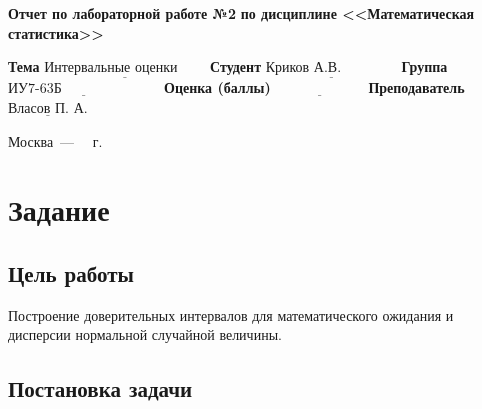 \documentclass[12pt]{report}
\begin{document}
\begin{titlepage}
		\begin{center}
			\noindent\begin{minipage}{1.1\textwidth}\centering
				\Large\textbf{  Отчет по лабораторной работе №2}\newline
				\textbf{по дисциплине <<Математическая статистика>>}\newline\newline\newline\newline
			\end{minipage}
		\end{center}
		
		\noindent\textbf{Тема} $\underline{\text{Интервальные оценки~~~~~~}}$\newline\newline
		\noindent\textbf{Студент} $\underline{\text{Криков А.В.~~~~~~~~~~~~}}$\newline\newline
		\noindent\textbf{Группа} $\underline{\text{ИУ7-63Б~~~~~~~~~~~~~~~~~~~~~}}$\newline\newline
		\noindent\textbf{Оценка (баллы)} $\underline{\text{~~~~~~~~~~~~~~~~~~~}}$\newline\newline
		\noindent\textbf{Преподаватель} $\underline{\text{Власов П. А.}}$\newline\newline\newline
		
		\begin{center}
			\vfill
			Москва~---~\the\year
			~г.
		\end{center}
	\end{titlepage}

\chapter*{Задание}

\section*{Цель работы}
Построение доверительных интервалов для математического ожидания и дисперсии нормальной случайной величины.

\section*{Постановка задачи}
\end{document}
